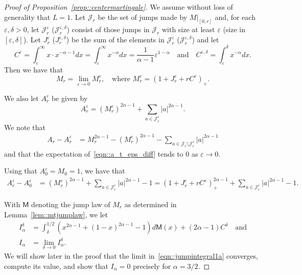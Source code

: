 \documentclass[10pt]{amsart}
\let\mathcal\mathscr
\let\epsilon\varepsilon
\theoremstyle{plain}
\numberwithin{theorem}{section}
\theoremstyle{definition}
\newcommand{\CJ}{{\mathcal J}}
\begin{document}
\begin{proof}[Proof of Proposition~\ref{prop::centermartingale}]
We assume without loss of generality that $L = 1$. Let $\CJ_r$ be the set of jumps made by $M|_{[0,r]}$ and, for each $\epsilon,\delta > 0$, let $\CJ_r^\epsilon$ (\resp $\CJ_r^{\epsilon,\delta}$) consist of those jumps in $\CJ_r$ with size at least $\epsilon$ (\resp size in $[\epsilon,\delta]$). Let $J_r^\epsilon$ (\resp $J_r^{\epsilon,\delta}$) be the sum of the elements in $\CJ_r^\epsilon$ (\resp $\CJ_r^{\epsilon,\delta}$) and let
\[
C^\epsilon = \int_\epsilon^\infty x \cdot x^{-\alpha - 1} dx = \int_\epsilon^\infty x^{-\alpha} dx = \frac{1}{\alpha-1} \epsilon^{1-\alpha} \quad\text{and}\quad C^{\epsilon,\delta} = \int_\epsilon^\delta x^{-\alpha} dx.
\]
Then we have that
\[
M_r = \lim_{\epsilon \to 0} M_r^\epsilon, \quad\text{where } M_r^\epsilon = (1 + J_r^\epsilon + r C^\epsilon)_+.
\]

We also let $A_r^\epsilon$ be given by
\[
A_r^\epsilon = (M_r^\epsilon)^{2\alpha-1} + \sum_{a \in \CJ_r^\epsilon} |a|^{2\alpha-1}.
\]
We note that
\begin{align}
\label{eqn::a_t_eps_diff}
A_r - A_r^\epsilon
&= M_r^{2\alpha-1} - (M_r^\epsilon)^{2\alpha-1} - \sum_{a \in \CJ_r \setminus \CJ_r^\epsilon} |a|^{2\alpha-1}
\end{align}
and that the expectation of~\eqref{eqn::a_t_eps_diff} tends to $0$ as $\epsilon \to 0$.

Using that $A_0^\epsilon = M_0 = 1$, we have that
\begin{align*}
A_r^\epsilon - A_0^\epsilon
&= (M_r^\epsilon)^{2\alpha-1} + \sum_{a \in \CJ_r^\epsilon} |a|^{2\alpha-1} - 1
= \left( 1+J_r^\epsilon + r C^\epsilon \right)_+^{2\alpha-1} + \sum_{a \in \CJ_r^\epsilon} |a|^{2\alpha-1} - 1.
\end{align*}

\newcommand{\jumplaw}{\mathsf{M}}

With $\jumplaw$ denoting the jump law of $M_r$ as determined in Lemma~\ref{lem::mtjumplaw}, we let
\begin{align}
I_\alpha^\delta &= \int_\delta^{1/2} \left( x^{2\alpha - 1} + (1-x)^{2\alpha -1} - 1 \right) d\jumplaw(x) + (2\alpha - 1)C^\delta \quad\text{and} \label{eqn::jumpintegral1}\\
I_\alpha &= \lim_{\delta \to 0} I_\alpha^\delta. \label{eqn::jumpintegral1a}
\end{align}
We will show later in the proof that the limit in~\eqref{eqn::jumpintegral1a} converges, compute its value, and show that $I_\alpha = 0$ precisely for $\alpha=3/2$.


\end{proof}
\end{document}
